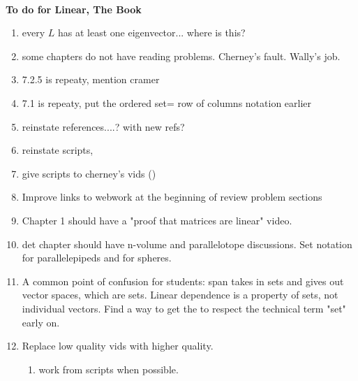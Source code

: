 \documentclass[12pt]{article}
\begin{document}
\thispagestyle{empty}
~
\vspace{-3cm}

\begin{center}
\vspace{-1.5cm}
{\Large{\bf  
To do for Linear, The Book
}
 }  
\end{center}



\begin{enumerate}

\item every $L$ has at least one eigenvector... where is this?

\item some chapters do not have reading problems. Cherney's fault. Wally's job.

\item 7.2.5 is repeaty, mention cramer

\item 7.1 is repeaty, put the ordered set= row of columns notation earlier

\item reinstate references....? with new refs?

\item reinstate scripts, 

\item give scripts to cherney's vids ()

\item Improve links to webwork at the beginning of review problem sections

\item Chapter 1 should have a "proof that matrices are linear" video. 

\item det chapter should have n-volume and parallelotope discussions. Set notation for parallelepipeds and for spheres.

\item A common point of confusion for students: span takes in sets and gives out vector spaces, which are sets. Linear dependence is a property of sets, not individual vectors. Find a way to get the to respect the technical term "set" early on. 

\item Replace low quality vids with higher quality. 
\begin{enumerate}
\item work from scripts when possible.
\end{enumerate}


\end{enumerate}
\end{document}
